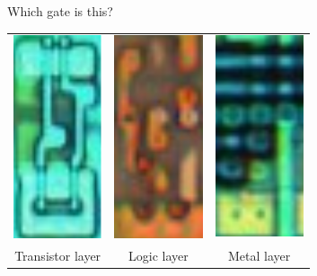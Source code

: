 \documentclass[aspectratio=169]{beamer}
\begin{document}
\begin{frame}{Which gate is this?}
	
	\begin{center}
		\begin{tabular}{ccc}
			\includegraphics[width=2.6cm]{res/nand2_transistor_a.png} &
			\includegraphics[width=2.6cm]{res/nand2_logic_a.png} &
			\includegraphics[width=2.6cm]{res/nand2_metal_a.png} \\
			\tiny Transistor layer &
			\tiny Logic layer &
			\tiny Metal layer \\
		\end{tabular}
	\end{center}
\end{frame}
\end{document}
